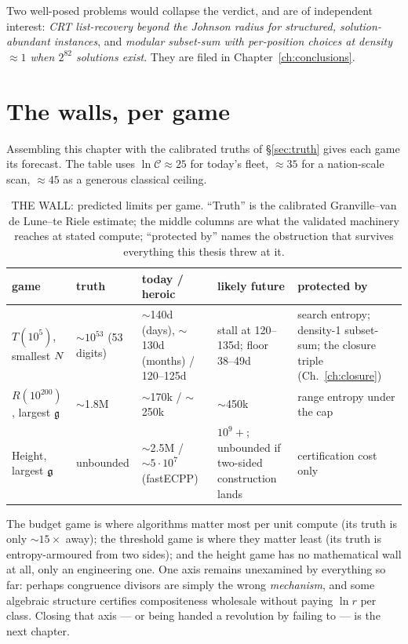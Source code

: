 Two well-posed problems would collapse the verdict, and are of
independent interest: \emph{CRT list-recovery beyond the Johnson
radius for structured, solution-abundant instances}, and
\emph{modular subset-sum with per-position choices at density
$\approx1$ when $2^{82}$ solutions exist}. They are filed in
Chapter~\ref{ch:conclusions}.

\section{The walls, per game}\label{sec:walls}

Assembling this chapter with the calibrated truths of
\S\ref{sec:truth} gives each game its forecast. The table uses
$\ln\mathcal C\approx25$ for today's fleet, $\approx35$ for a
nation-scale scan, $\approx45$ as a generous classical ceiling.

\begin{table}[h]
\centering\small
\caption{THE WALL: predicted limits per game. ``Truth'' is the
calibrated Granville--van de Lune--te Riele estimate; the middle
columns are what the validated machinery reaches at stated compute;
``protected by'' names the obstruction that survives everything this
thesis threw at it.}\label{tab:walls}
\begin{tabular}{p{}p{}p{}p{}p{}}
\toprule
game & truth & today / heroic & likely future & protected by\\
\midrule
$T(10^5)$, smallest $N$ & $\sim10^{53}$ (53 digits) & $\sim$140d (days), $\sim$130d (months) / 120--125d & stall at 120--135d; floor 38--49d & search entropy; density-1 subset-sum; the closure triple (Ch.~\ref{ch:closure})\\
$R(10^{200})$, largest $\mathfrak{g}$ & $\sim$1.8M & $\sim$170k / $\sim$250k & $\sim$450k & range entropy under the cap\\
Height, largest $\mathfrak{g}$ & unbounded & $\sim$2.5M / $\sim5\cdot10^7$ (fastECPP) & $10^9+$; unbounded if two-sided construction lands & certification cost only\\
\bottomrule
\end{tabular}
\end{table}

The budget game is where algorithms matter most per unit compute (its
truth is only $\sim$$15\times$ away); the threshold game is where they
matter least (its truth is entropy-armoured from two sides); and the
height game has no mathematical wall at all, only an engineering one.
One axis remains unexamined by everything so far: perhaps congruence
divisors are simply the wrong \emph{mechanism}, and some algebraic
structure certifies compositeness wholesale without paying $\ln r$ per
class. Closing that axis --- or being handed a revolution by failing to
--- is the next chapter.
